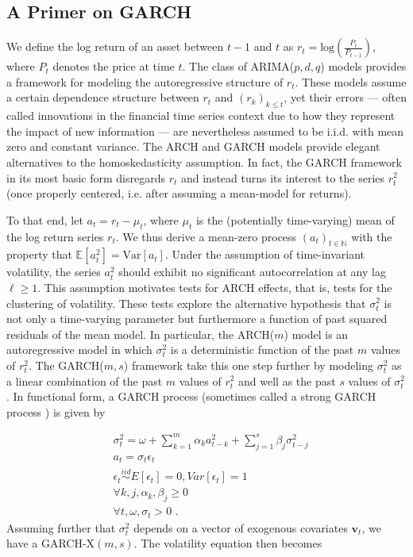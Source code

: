 \documentclass[11pt,3p,review,authoryear]{elsarticle}
\newcommand{\x}{\textbf{v}}
\newcommand{\simiid}{\stackrel{iid}{\sim}} %
\def\mrm#1{\mathrm{#1}} %
\def\E{\mathbb{E}} %
\theoremstyle{definition}
\begin{document}
  \subsection{A Primer on GARCH}
We define the log return of an asset between $t-1$ and $t$ as $r_{t} = \text{log}(\frac{P_{t}}{P_{t-1}})$, where $P_{t}$ denotes the price at time $t$.  The class of ARIMA($p,d,q$) models  \citep{box2013box} provides a framework for modeling the autoregressive structure of $r_{t}$.  These models assume a certain dependence structure between $r_{t}$ and $(r_{k})_{k\leq t}$, yet their errors --- often called innovations in the financial time series context due to how they represent the impact of new information --- are nevertheless assumed to be i.i.d. with mean zero and constant variance.  The ARCH \citep{engle1982autoregressive} and GARCH \citep{bollerslev1986generalized} models provide elegant alternatives to the homoskedasticity assumption.  In fact, the GARCH framework in its most basic form disregards $r_{t}$ and instead turns its interest to the series $r_{t}^{2}$ (once properly centered, i.e. after assuming a mean-model for returns).  

To that end, let $a_{t} = r_{t} - \mu_{t}$, where $\mu_{t}$ is the (potentially time-varying) mean of the log return series $r_{t}$.  We thus derive a mean-zero process $(a_{t})_{t\in\mathbb{N}}$ with the property that $\E[a^{2}_{t}] = \mrm{Var}[a_{t}]$.  Under the assumption of time-invariant volatility, the series $a_{t}^{2}$ should exhibit no significant autocorrelation at any lag $\ell\geq1$.  This assumption motivates tests for ARCH effects, that is, tests for the clustering of volatility.  These tests explore the alternative hypothesis that $\sigma_{t}^{2}$ is not only a time-varying parameter but furthermore a function of past squared residuals of the mean model.  In particular, the ARCH($m$) model is an autoregressive model in which $\sigma_{t}^{2}$ is a deterministic function of the past $m$ values of $r_{t}^{2}$.  The GARCH($m,s$) framework take this one step further by modeling $\sigma_{t}^{2}$ as a linear combination of the past $m$ values of $r_{t}^{2}$ and well as the past $s$ values of $\sigma_{t}^{2}$.  In functional form, a GARCH process (sometimes called a strong GARCH process \citep[p. 19]{francq2019garch}) is given by

\begin{align*}
&\sigma_{t}^{2} = \omega + \sum^{m}_{k=1}\alpha_{k}a^{2}_{t-k} + \sum_{j=1}^{s}\beta_{j}\sigma_{t-j}^{2}\\
&a_{t} = \sigma_{t}\epsilon_{t}\\
&\epsilon_{t} \simiid E[\epsilon_{t}]=0, Var[\epsilon_{t}] = 1\\
&\forall k,j, \alpha_{k},\beta_{j}\geq 0\\ 
&\forall t, \omega, \sigma_{t} > 0 \text { .} 
\end{align*}
Assuming further that $\sigma^{2}_{t}$ depends on a vector of exogenous covariates $\x_{t}$, we have a  GARCH-X$(m,s)$.  The volatility equation then becomes 
\end{document}
